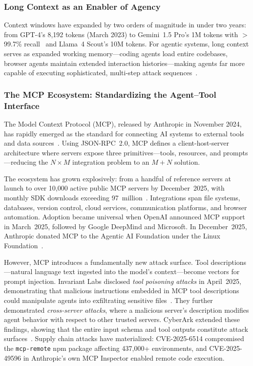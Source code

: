 \subsubsection{Long Context as an Enabler of Agency}
\label{sec:cap-context}

Context windows have expanded by two orders of magnitude in under two years: from GPT-4's 8,192 tokens (March 2023) to Gemini~1.5 Pro's 1M tokens with $>$99.7\% recall~\cite{gemini15} and Llama~4 Scout's 10M tokens. For agentic systems, long context serves as expanded working memory---coding agents load entire codebases, browser agents maintain extended interaction histories---making agents far more capable of executing sophisticated, multi-step attack sequences~\cite{anthropic2024effective}.


\subsubsection{The MCP Ecosystem: Standardizing the Agent--Tool Interface}
\label{sec:cap-mcp}

The Model Context Protocol (MCP), released by Anthropic in November 2024, has rapidly emerged as the standard for connecting AI systems to external tools and data sources~\cite{anthropic2024mcp}. Using JSON-RPC~2.0, MCP defines a client-host-server architecture where servers expose three primitives---tools, resources, and prompts---reducing the $N \times M$ integration problem to an $M+N$ solution.

The ecosystem has grown explosively: from a handful of reference servers at launch to over 10,000 active public MCP servers by December~2025, with monthly SDK downloads exceeding 97~million~\cite{mcp2025anniversary}. Integrations span file systems, databases, version control, cloud services, communication platforms, and browser automation. Adoption became universal when OpenAI announced MCP support in March~2025, followed by Google DeepMind and Microsoft. In December~2025, Anthropic donated MCP to the Agentic AI Foundation under the Linux Foundation~\cite{anthropic2025aaif}.

However, MCP introduces a fundamentally new attack surface. Tool descriptions---natural language text ingested into the model's context---become vectors for prompt injection. Invariant Labs disclosed \emph{tool poisoning attacks} in April~2025, demonstrating that malicious instructions embedded in MCP tool descriptions could manipulate agents into exfiltrating sensitive files~\cite{invariant2025toolpoisoning}. They further demonstrated \emph{cross-server attacks}, where a malicious server's description modifies agent behavior with respect to other trusted servers. CyberArk extended these findings, showing that the entire input schema and tool outputs constitute attack surfaces~\cite{cyberark2025atpa}. Supply chain attacks have materialized: CVE-2025-6514 compromised the \texttt{mcp-remote} npm package affecting 437,000+ environments, and CVE-2025-49596 in Anthropic's own MCP Inspector enabled remote code execution.

